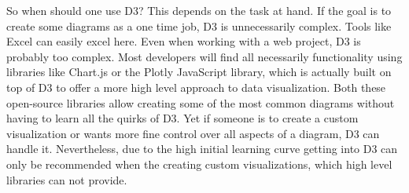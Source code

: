 So when should one use D3? This depends on the task at hand. If the goal is to create some diagrams as a one time job, D3 is unnecessarily complex. Tools like Excel can easily excel here. Even when working with a web project, D3 is probably too complex. Most developers will find all necessarily functionality using libraries like Chart.js\cite{chartjs} or the Plotly\cite{plotly} JavaScript library, which is actually built on top of D3 to offer a more high level approach to data visualization. Both these open-source libraries allow creating some of the most common diagrams without having to learn all the quirks of D3.
Yet if someone is to create a custom visualization or wants more fine control over all aspects of a diagram, D3 can handle it.
Nevertheless, due to the high initial learning curve getting into D3 can only be recommended when the creating custom visualizations, which high level libraries can not provide.
